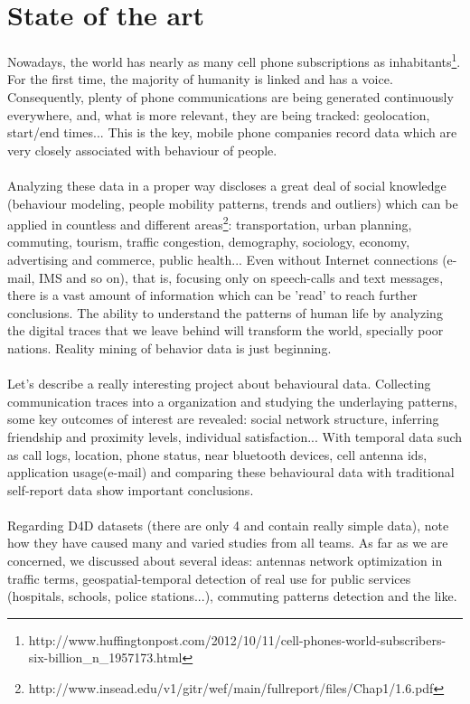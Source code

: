 \newpage

\section{State of the art}

Nowadays, the world has nearly as many cell phone subscriptions as inhabitants\footnote{http://www.huffingtonpost.com/2012/10/11/cell-phones-world-subscribers-six-billion\_n\_1957173.html}. For the first time, the majority of humanity is linked and has a voice. Consequently, plenty of phone communications are being generated continuously everywhere, and, what is more relevant, they are being tracked: geolocation, start/end times... This is the key, mobile phone companies record data which are very closely associated with behaviour of people.
\\
\\
Analyzing these data in a proper way discloses a great deal of social knowledge (behaviour modeling, people mobility patterns, trends and outliers) which can be applied in countless and different areas\footnote{http://www.insead.edu/v1/gitr/wef/main/fullreport/files/Chap1/1.6.pdf}: transportation, urban planning, commuting, tourism, traffic congestion, demography, sociology, economy, advertising and commerce, public health... Even without Internet connections (e-mail, IMS and so on), that is, focusing only on speech-calls and text messages, there is a vast amount of information which can be 'read' to reach further conclusions. The ability to understand the patterns of human life by analyzing the digital traces that we leave behind will transform the world, specially poor nations. Reality mining of behavior data is just beginning.
\\
\\
Let's describe a really interesting project \citep{eage09} about behavioural data. Collecting communication traces into a organization and studying the underlaying patterns, some key outcomes of interest are revealed: social network structure, inferring friendship and proximity levels, individual satisfaction... With temporal data such as call logs, location, phone status, near bluetooth devices, cell antenna ids, application usage(e-mail) and comparing these behavioural data with traditional self-report data show important conclusions.
\\
\\
Regarding D4D datasets (there are only 4 and contain really simple data), note how they have caused many and varied studies from all teams. As far as we are concerned, we discussed about several ideas: antennas network optimization in traffic terms, geospatial-temporal detection of real use for public services (hospitals, schools, police stations...), commuting patterns detection and the like.
